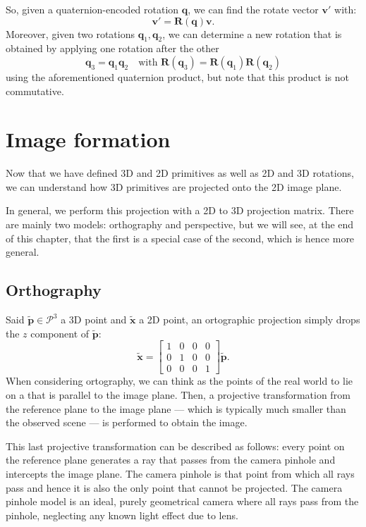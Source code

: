 So, given a quaternion-encoded rotation $\mathbf{q}$, we can find the rotate vector $\mathbf{v}'$ with:
$$\mathbf{v}'=\mathbf{R}(\mathbf{q})\mathbf{v}.$$
Moreover, given two rotations $\mathbf{q}_{1},\mathbf{q}_{2}$, we can determine a new rotation that is obtained by applying one rotation after the other
$$\mathbf{q}_{3}=\mathbf{q}_{1}\mathbf{q}_{2}\quad \text{with } \mathbf{R}(\mathbf{q}_{3})=\mathbf{R}(\mathbf{q}_{1})\mathbf{R}(\mathbf{q}_{2})$$
using the aforementioned quaternion product, but note that this product is not commutative.


\section{Image formation}
Now that we have defined 3D and 2D primitives as well as 2D and 3D rotations, we can understand how 3D primitives are projected onto the 2D image plane.

In general, we perform this projection with a 2D to 3D projection matrix.
There are mainly two models: orthography and perspective, but we will see, at the end of this chapter, that the first is a special case of the second, which is hence more general.

\subsection{Orthography}
Said $\tilde{\mathbf{p}}\in \mathcal{P}^3$ a 3D point and $\tilde{\mathbf{x}}$ a 2D point, an ortographic projection simply drops the $z$ component of $\tilde{\mathbf{p}}$:
$$\tilde{\mathbf{x}}=\begin{bmatrix}
1 & 0 & 0 & 0\\
0 & 1 & 0 & 0\\
0 & 0 & 0 & 1
\end{bmatrix}\tilde{\mathbf{p}}.$$
When considering ortography, we can think as the points of the real world to lie on a  that is parallel to the image plane.
Then, a projective transformation from the reference plane to the image plane --- which is typically much smaller than the observed scene --- is performed to obtain the image.

This last projective transformation can be described as follows: every point on the reference plane generates a ray that passes from the camera pinhole and intercepts the image plane.
The camera pinhole is that point from which all rays pass and hence it is also the only point that cannot be projected. The camera pinhole model is an ideal, purely geometrical camera where all rays pass from the pinhole, neglecting any known light effect due to lens.

